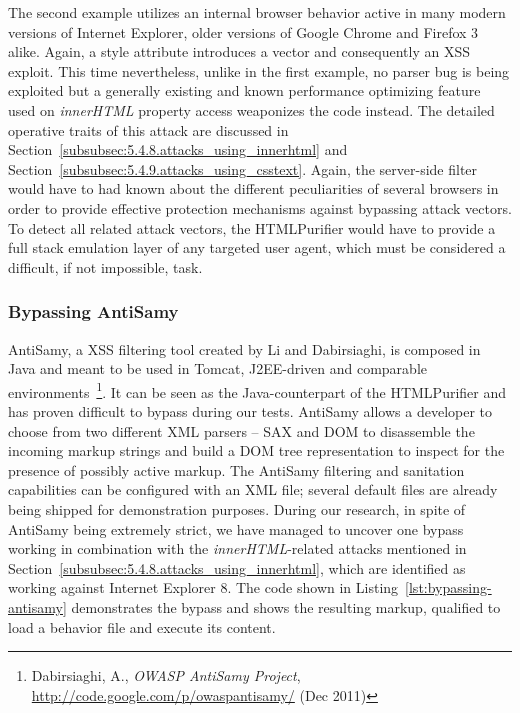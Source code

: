       The second example utilizes an internal browser behavior active in many modern versions of Internet Explorer, older versions of Google Chrome and Firefox 3 alike. Again, a style attribute introduces a vector and consequently an XSS exploit. This time nevertheless, unlike in the first example, no parser bug is being exploited but a generally existing and known performance optimizing feature used on \textit{innerHTML} property access weaponizes the code instead. The detailed operative traits of this attack are discussed in Section~\ref{subsubsec:5.4.8.attacks_using_innerhtml} and Section~\ref{subsubsec:5.4.9.attacks_using_csstext}. Again, the server-side filter would have to had known about the different peculiarities of several browsers in order to provide effective protection mechanisms against bypassing attack vectors. To detect all related attack vectors, the HTMLPurifier would have to provide a full stack emulation layer of any targeted user agent, which must be considered a difficult, if not 
impossible, task.\\

      \subsubsection{Bypassing AntiSamy}
      \label{subsubsec:bypassing_anti_samy}

      AntiSamy, a XSS filtering tool created by Li and Dabirsiaghi, is composed in Java and meant to be used in Tomcat, J2EE-driven and comparable environments~\footnote{Dabirsiaghi, A., \textit{OWASP AntiSamy Project}, \url{http://code.google.com/p/owaspantisamy/} (Dec 2011)}. It can be seen as the Java-counterpart of the HTMLPurifier and has proven difficult to bypass during our tests. AntiSamy allows a developer to choose from two different XML parsers -- SAX and DOM to disassemble the incoming markup strings and build a DOM tree representation to inspect for the presence of possibly active markup. The AntiSamy filtering and sanitation capabilities can be configured with an XML file; several default files are already being shipped for demonstration purposes. During our research, in spite of AntiSamy being extremely strict, we have managed to uncover one bypass working in combination with the \textit{innerHTML}-related attacks mentioned in Section~\ref{subsubsec:5.4.8.attacks_using_innerhtml}, which are 
identified as working against Internet Explorer 8. The code shown in Listing~\ref{lst:bypassing-antisamy} demonstrates the bypass and shows the resulting markup, qualified to load a behavior file and execute its content.

